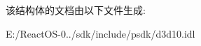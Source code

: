 \begin{DoxyCompactItemize}
\begin{tabbing}
\end{tabbing}\end{DoxyCompactItemize}


该结构体的文档由以下文件生成\+:\begin{DoxyCompactItemize}
\item 
E\+:/\+React\+O\+S-\/0../sdk/include/psdk/d3d10.\+idl\end{DoxyCompactItemize}

